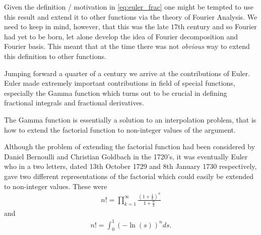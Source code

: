 Given the definition / motivation in \eqref{eq:euler_frac} one might be tempted to use this result and extend it to other functions via the theory of Fourier Analysis. We need to keep in mind, however, that this was the late $ 17$th century and so Fourier had yet to be born, let alone develop the idea of Fourier decomposition and Fourier basis. This meant that at the time there was not \emph{obvious} way to extend this definition to other functions.

Jumping forward a quarter of a century we arrive at the contributions of Euler. Euler made extremely important contributions in field of special functions, especially the Gamma function which turns out to be crucial in defining fractional integrals and fractional derivatives.

The Gamma function is essentially a solution to an interpolation problem, that is how to extend the factorial function to non-integer values of the argument. 

Although the problem of extending the factorial function had been considered by Daniel Bernoulli and Christian Goldbach in the 1720’s, it was eventually Euler who in a two letters, dated 13th October 1729 and 8th January 1730 respectively, gave two different representations of the factorial which could easily be extended to non-integer values. These were
\begin{align}
    \label{eq:euler_prod}
    n! = \prod_{k=1}^\infty \frac{\left(1+\frac{1}{k}\right)^n}{1 + \frac{n}{k}}
\end{align}
and
\begin{align}
    \label{eq:euler_log}
    n! = \int_0^1 (-\ln(s))^n ds.
\end{align}

